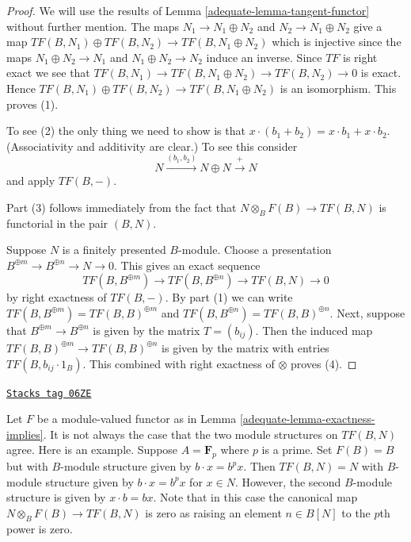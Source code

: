 \begin{proof}

We will use the results of
Lemma \ref{adequate-lemma-tangent-functor}
without further mention.
The maps $N_1 \to N_1 \oplus N_2$ and $N_2 \to N_1 \oplus N_2$ give
a map $TF(B, N_1) \oplus TF(B, N_2) \to TF(B, N_1 \oplus N_2)$
which is injective since the maps $N_1 \oplus N_2 \to N_1$ and
$N_1 \oplus N_2 \to N_2$ induce an inverse.
Since $TF$ is right exact we see that
$TF(B, N_1) \to TF(B, N_1 \oplus N_2) \to TF(B, N_2) \to 0$ is exact.
Hence $TF(B, N_1) \oplus TF(B, N_2) \to TF(B, N_1 \oplus N_2)$ is an
isomorphism. This proves (1).

\medskip\noindent
To see (2) the only thing we need to show is that
$x \cdot (b_1 + b_2) = x \cdot b_1 + x \cdot b_2$.
(Associativity and additivity are clear.) To see this consider
$$
N \xrightarrow{(b_1, b_2)} N \oplus N \xrightarrow{+} N
$$
and apply $TF(B, -)$.

\medskip\noindent
Part (3) follows immediately from the fact that
$N \otimes_B F(B) \to TF(B, N)$ is functorial in the pair $(B, N)$.

\medskip\noindent
Suppose $N$ is a finitely presented $B$-module. Choose a presentation
$B^{\oplus m} \to B^{\oplus n} \to N \to 0$. This gives an exact
sequence
$$
TF(B, B^{\oplus m}) \to TF(B, B^{\oplus n}) \to TF(B, N) \to 0
$$
by right exactness of $TF(B, -)$. By part (1) we can write
$TF(B, B^{\oplus m}) = TF(B, B)^{\oplus m}$ and
$TF(B, B^{\oplus n}) = TF(B, B)^{\oplus n}$. Next, suppose that
$B^{\oplus m} \to B^{\oplus n}$ is given by the matrix $T = (b_{ij})$.
Then the induced map $TF(B, B)^{\oplus m} \to TF(B, B)^{\oplus n}$
is given by the matrix with entries $TF(B, b_{ij} \cdot 1_B)$.
This combined with right exactness of $\otimes$ proves (4).
\end{proof}

\begin{example}
\label{adequate-example-module-structure-different}
\href{https://stacks.math.columbia.edu/tag/06ZE}{\texttt{Stacks tag 06ZE}}

Let $F$ be a module-valued functor as in
Lemma \ref{adequate-lemma-exactness-implies}.
It is not always the case that the two module structures on
$TF(B, N)$ agree. Here is an example. Suppose $A = \mathbf{F}_p$
where $p$ is a prime. Set $F(B) = B$ but with $B$-module structure
given by $b \cdot x = b^px$. Then $TF(B, N) = N$ with $B$-module structure
given by $b \cdot x = b^px$ for $x \in N$. However, the second $B$-module
structure is given by $x \cdot b = bx$. Note that in this case the canonical
map $N \otimes_B F(B) \to TF(B, N)$ is zero as raising an element
$n \in B[N]$ to the $p$th power is zero.
\end{example}

